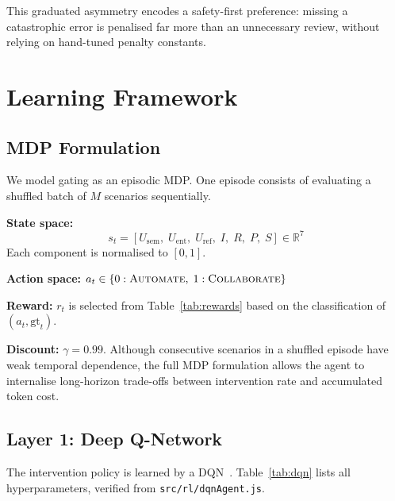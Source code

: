 \documentclass[conference]{IEEEtran}
\newcommand{\Usem}{U_{\mathrm{sem}}}
\newcommand{\Uent}{U_{\mathrm{ent}}}
\newcommand{\Uref}{U_{\mathrm{ref}}}
\begin{document}
This graduated asymmetry encodes a safety-first preference: missing a
catastrophic error is penalised far more than an unnecessary review, without
relying on hand-tuned penalty constants.

\section{Learning Framework}\label{sec:rl}

\subsection{MDP Formulation}

We model gating as an episodic MDP.
One episode consists of evaluating a shuffled batch of $M$ scenarios
sequentially.

\textbf{State space:}
\begin{equation}
  \label{eq:state}
  s_t = [\Usem,\;\Uent,\;\Uref,\;I,\;R,\;P,\;S] \in \mathbb{R}^7
\end{equation}
Each component is normalised to $[0,1]$.

\textbf{Action space:}
$a_t \in \{0 : \textsc{Automate},\; 1 : \textsc{Collaborate}\}$

\textbf{Reward:} $r_t$ is selected from Table~\ref{tab:rewards} based on
the classification of $(a_t, \mathrm{gt}_t)$.

\textbf{Discount:} $\gamma = 0.99$.
Although consecutive scenarios in a shuffled episode have weak temporal
dependence, the full MDP formulation allows the agent to internalise
long-horizon trade-offs between intervention rate and accumulated token cost.

\subsection{Layer 1: Deep Q-Network}

The intervention policy is learned by a DQN~\cite{mnih2015dqn}.
Table~\ref{tab:dqn} lists all hyperparameters, verified from
\texttt{src/rl/dqnAgent.js}.
\end{document}
